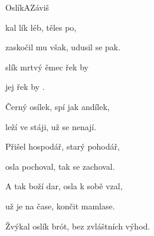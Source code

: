 \setcounter{page}{62}
\begin{song}{Oslík}{A}{Záviš}

\begin{SBVerse}

kal lík léb,  těles po,

zaskočil mu však, udusil se pak.

\end{SBVerse}

\begin{SBChorus}

slík mrtvý  ěmec řek by 

 jej   řek by .

\end{SBChorus}

\begin{SBVerse}

Černý osílek, spí jak andílek,

leží ve stáji, už se nenají.

\end{SBVerse}

\begin{SBChorus}

\end{SBChorus}

\begin{SBVerse}

Přišel hospodář, starý pohodář,

osla pochoval, tak se zachoval.

\end{SBVerse}

\begin{SBChorus}

\end{SBChorus}

\begin{SBVerse}

A tak boží dar, osla k sobě vzal,

už je na čase, končit mamlase.

\end{SBVerse}

\begin{SBChorus}

\end{SBChorus}

\begin{SBChorus*}

Žvýkal oslík brót, bez zvláštních výhod.

\end{SBChorus*}

\end{song}

\clearpage
